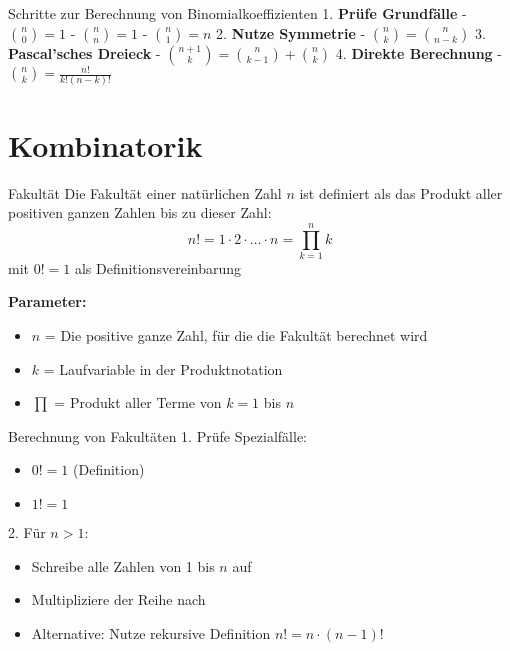 \begin{KR}{Schritte zur Berechnung von Binomialkoeffizienten}
1. \textbf{Prüfe Grundfälle}
   - $\binom{n}{0} = 1$
   - $\binom{n}{n} = 1$
   - $\binom{n}{1} = n$
2. \textbf{Nutze Symmetrie}
   - $\binom{n}{k} = \binom{n}{n-k}$
3. \textbf{Pascal'sches Dreieck}
   - $\binom{n+1}{k} = \binom{n}{k-1} + \binom{n}{k}$
4. \textbf{Direkte Berechnung}
   - $\binom{n}{k} = \frac{n!}{k!(n-k)!}$
\end{KR}

\section{Kombinatorik}

\begin{definition}{Fakultät}
Die Fakultät einer natürlichen Zahl $n$ ist definiert als das Produkt aller positiven ganzen Zahlen bis zu dieser Zahl:
$$
n!=1 \cdot 2 \cdot \ldots \cdot n=\prod_{k=1}^{n} k
$$
mit $0! = 1$ als Definitionsvereinbarung

\textbf{Parameter:}
\begin{itemize}
    \item $n$ = Die positive ganze Zahl, für die die Fakultät berechnet wird
    \item $k$ = Laufvariable in der Produktnotation
    \item $\prod$ = Produkt aller Terme von $k=1$ bis $n$
\end{itemize}
\end{definition}

\begin{KR}{Berechnung von Fakultäten}
1. Prüfe Spezialfälle:
   \begin{itemize}
   \item $0! = 1$ (Definition)
   \item $1! = 1$
   \end{itemize}
2. Für $n > 1$:
   \begin{itemize}
   \item Schreibe alle Zahlen von 1 bis $n$ auf
   \item Multipliziere der Reihe nach
   \item Alternative: Nutze rekursive Definition $n! = n \cdot (n-1)!$
   \end{itemize}
\end{KR}

